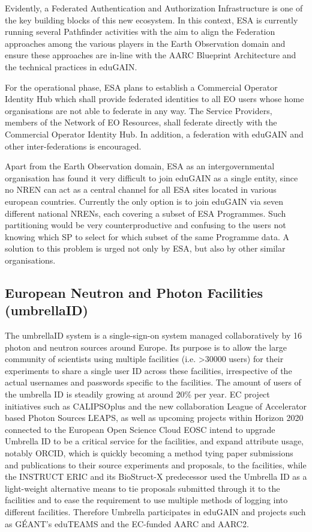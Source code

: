 \documentclass[fleqn,10pt]{wlscirep}
\begin{document}
{Evidently, a Federated Authentication and Authorization Infrastructure is one of the key building blocks of this new ecosystem. In this context, ESA is currently running several Pathfinder activities with the aim to align the Federation approaches among the various players in the Earth Observation domain and ensure these approaches are in-line with the AARC Blueprint Architecture and the technical practices in eduGAIN.

For the operational phase, ESA plans to establish a Commercial Operator Identity Hub which shall provide federated identities to all EO users whose home organisations are not able to federate in any way. The Service Providers, members of the Network of EO Resources, shall federate directly with the Commercial Operator Identity Hub. In addition, a federation with eduGAIN and other inter-federations is encouraged.

Apart from the Earth Observation domain, ESA as an intergovernmental organisation has found it very difficult to join eduGAIN as a single entity, since no NREN can act as a central channel for all ESA sites located in various european countries. Currently the only option is to join eduGAIN via seven different national NRENs, each covering a subset of ESA Programmes. Such partitioning would be very counterproductive and confusing to the users not knowing which SP to select for which subset of the same Programme data. A solution to this problem is urged not only by ESA, but also by other similar organisations.

\subsection{European Neutron and Photon Facilities (umbrellaID)}
The umbrellaID system is a single-sign-on system managed collaboratively by 16 photon and neutron sources around Europe. Its purpose is to allow the large community of scientists using multiple facilities (i.e. >30000 users) for their experiments to share a single user ID across these facilities, irrespective of the actual usernames and passwords specific to the facilities. The amount of users of the umbrella ID is steadily growing at around 20\% per year. 
EC project initiatives such as CALIPSOplus and the new collaboration League of Accelerator based Photon Sources LEAPS, as well as upcoming projects within Horizon 2020 connected to the European Open Science Cloud EOSC intend to upgrade Umbrella ID to be a critical service for the facilities, and expand attribute usage, notably ORCID, which is quickly becoming a method tying paper submissions and publications to their source experiments and proposals, to the facilities, while the INSTRUCT ERIC and its BioStruct-X predecessor used the Umbrella ID as a light-weight alternative means to tie proposals submitted through it to the facilities and to ease the requirement to use multiple methods of logging into different facilities. Therefore Umbrella participates  in eduGAIN and projects such as GÉANT’s eduTEAMS and the EC-funded AARC and AARC2.
 
}
\end{document}
